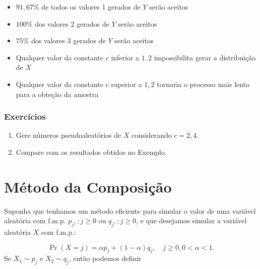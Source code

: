 \documentclass[
  letterpaper,
  DIV=11,
  numbers=noendperiod]{scrreprt}
\begin{document}
\begin{tcolorbox}[enhanced jigsaw, left=2mm, toprule=.15mm, opacityback=0, title={Observações}, leftrule=.75mm, breakable, colbacktitle=quarto-callout-important-color!10!white, coltitle=black, rightrule=.15mm, bottomtitle=1mm, toptitle=1mm, colframe=quarto-callout-important-color-frame, colback=white, opacitybacktitle=0.6, bottomrule=.15mm, arc=.35mm, titlerule=0mm]

\begin{itemize}
\item
  \(91,\!67\%\) de todos os valores 1 gerados de \(Y\) serão aceitos
\item
  \(100\%\) dos valores 2 gerados de \(Y\) serão aceitos
\item
  \(75\%\) dos valores 3 gerados de \(Y\) serão aceitos
\item
  Qualquer valor da constante \(c\) inferior a \(1,\!2\) impossibilita
  gerar a distribuição de \(X\)
\item
  Qualquer valor da constante \(c\) superior a \(1,\!2\) tornaria o
  processo mais lento para a obteção da amostra
\end{itemize}

\end{tcolorbox}

\subsubsection*{Exercícios}\label{exercuxedcios-8}

\begin{enumerate}
\def\labelenumi{\arabic{enumi}.}
\item
  Gere números pseudoaleatórios de \(X\) considerando \(c = 2,4\).
\item
  Compare com os resultados obtidos no Exemplo.
\end{enumerate}

\section{Método da Composição}\label{muxe9todo-da-composiuxe7uxe3o}

Suponha que tenhamos um método eficiente para simular o valor de uma
variável aleatória com f.m.p. \({p_j, ; j \geq 0}\) ou
\({q_j, ; j \geq 0}\), e que desejamos simular a variável aleatória
\(X\) com f.m.p.:

\[\Pr(X = j) = \alpha p_j + (1 - \alpha)q_j, \quad j \geq 0, 0 < \alpha < 1.\]
Se \(X_1 \sim {p_j}\) e \(X_2 \sim {q_j}\), então podemos definir
\end{document}
